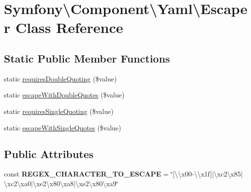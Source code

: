\hypertarget{classSymfony_1_1Component_1_1Yaml_1_1Escaper}{}\section{Symfony\textbackslash{}Component\textbackslash{}Yaml\textbackslash{}Escaper Class Reference}
\label{classSymfony_1_1Component_1_1Yaml_1_1Escaper}
\subsection*{Static Public Member Functions}
\begin{DoxyCompactItemize}
\item 
static \hyperlink{classSymfony_1_1Component_1_1Yaml_1_1Escaper_a1890e0b6163714726892cfe138a50b32}{requires\+Double\+Quoting} (\$value)
\item 
static \hyperlink{classSymfony_1_1Component_1_1Yaml_1_1Escaper_aea1e3903e40402a6775c7159b0ea80cc}{escape\+With\+Double\+Quotes} (\$value)
\item 
static \hyperlink{classSymfony_1_1Component_1_1Yaml_1_1Escaper_ac43ffdb64e5aeeb53edc31c44e5f6e79}{requires\+Single\+Quoting} (\$value)
\item 
static \hyperlink{classSymfony_1_1Component_1_1Yaml_1_1Escaper_a56debf878e167467d6c92cc5996f0300}{escape\+With\+Single\+Quotes} (\$value)
\end{DoxyCompactItemize}
\subsection*{Public Attributes}
\begin{DoxyCompactItemize}
\item 
const {\bfseries R\+E\+G\+E\+X\+\_\+\+C\+H\+A\+R\+A\+C\+T\+E\+R\+\_\+\+T\+O\+\_\+\+E\+S\+C\+A\+PE} = \char`\"{}\mbox{[}\textbackslash{}\textbackslash{}x00-\/\textbackslash{}\textbackslash{}x1f\mbox{]}$\vert$\textbackslash{}xc2\textbackslash{}x85$\vert$\textbackslash{}xc2\textbackslash{}xa0$\vert$\textbackslash{}xe2\textbackslash{}x80\textbackslash{}xa8$\vert$\textbackslash{}xe2\textbackslash{}x80\textbackslash{}xa9\char`\"{}\hypertarget{classSymfony_1_1Component_1_1Yaml_1_1Escaper_ae46b03f1f3c4c384a9406092eea1c8b0}{}\label{classSymfony_1_1Component_1_1Yaml_1_1Escaper_ae46b03f1f3c4c384a9406092eea1c8b0}

\end{DoxyCompactItemize}



